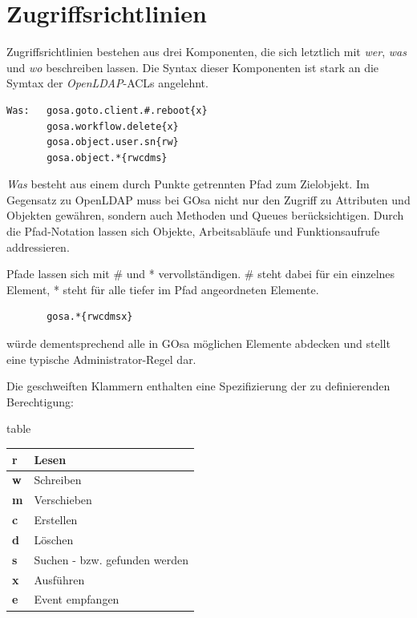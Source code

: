 \section{Zugriffsrichtlinien}

Zugriffsrichtlinien bestehen aus drei Komponenten, die sich letztlich mit
\textit{wer}, \textit{was} und \textit{wo} beschreiben lassen. Die Syntax
dieser Komponenten ist stark an die Symtax der \textit{OpenLDAP}-ACLs angelehnt.

\begin{verbatim}
Was:   gosa.goto.client.#.reboot{x}
       gosa.workflow.delete{x}
       gosa.object.user.sn{rw}
       gosa.object.*{rwcdms}
\end{verbatim}

\textit{Was} besteht aus einem durch Punkte getrennten Pfad zum Zielobjekt. Im
Gegensatz zu OpenLDAP muss bei GOsa nicht nur den Zugriff zu Attributen und
Objekten gewähren, sondern auch Methoden und Queues berücksichtigen. Durch
die Pfad-Notation lassen sich Objekte, Arbeitsabläufe und Funktionsaufrufe
addressieren.

Pfade lassen sich mit \# und * vervollständigen. \# steht dabei für ein einzelnes
Element, * steht für alle tiefer im Pfad angeordneten Elemente.

\begin{verbatim}
       gosa.*{rwcdmsx}
\end{verbatim}

würde dementsprechend alle in GOsa möglichen Elemente abdecken und stellt
eine typische Administrator-Regel dar.

Die geschweiften Klammern enthalten eine Spezifizierung der zu definierenden
Berechtigung:

\begin{nofloat}{table}
 \begin{center}
  \begin{tabularx}{\textwidth}[]{|X|X|}
   \hline
   \bf{r}      & Lesen \\
   \hline
   \bf{w}      & Schreiben \\
   \hline
   \bf{m}      & Verschieben \\
   \hline
   \bf{c}      & Erstellen \\
   \hline
   \bf{d}      & Löschen \\
   \hline
   \bf{s}      & Suchen - bzw. gefunden werden \\
   \hline
   \bf{x}      & Ausführen \\
   \hline
   \bf{e}      & Event empfangen \\
   \hline
  \end{tabularx}
 \end{center}
\end{nofloat}

